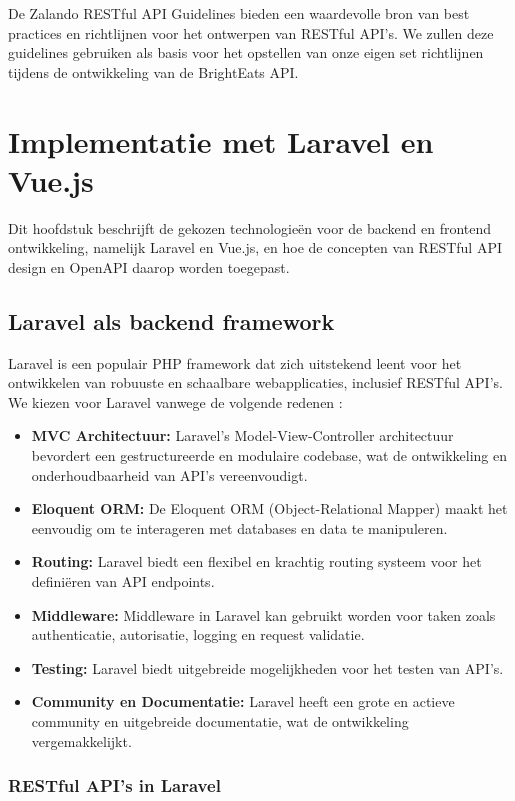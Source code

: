De Zalando RESTful API Guidelines bieden een waardevolle bron van best practices en richtlijnen voor het ontwerpen van RESTful API's. We zullen deze guidelines gebruiken als basis voor het opstellen van onze eigen set richtlijnen tijdens de ontwikkeling van de BrightEats API.

\section{Implementatie met Laravel en Vue.js}

Dit hoofdstuk beschrijft de gekozen technologieën voor de backend en frontend ontwikkeling, namelijk Laravel en Vue.js, en hoe de concepten van RESTful API design en OpenAPI daarop worden toegepast.

\subsection{Laravel als backend framework}

Laravel is een populair PHP framework dat zich uitstekend leent voor het ontwikkelen van robuuste en schaalbare webapplicaties, inclusief RESTful API's. We kiezen voor Laravel vanwege de volgende redenen \autocite{Laravel}:

\begin{itemize}
  \item \textbf{MVC Architectuur:} Laravel's Model-View-Controller architectuur bevordert een gestructureerde en modulaire codebase, wat de ontwikkeling en onderhoudbaarheid van API's vereenvoudigt.
  \item \textbf{Eloquent ORM:} De Eloquent ORM (Object-Relational Mapper) maakt het eenvoudig om te interageren met databases en data te manipuleren.
  \item \textbf{Routing:} Laravel biedt een flexibel en krachtig routing systeem voor het definiëren van API endpoints.
  \item \textbf{Middleware:} Middleware in Laravel kan gebruikt worden voor taken zoals authenticatie, autorisatie, logging en request validatie.
  \item \textbf{Testing:} Laravel biedt uitgebreide mogelijkheden voor het testen van API's.
  \item \textbf{Community en Documentatie:} Laravel heeft een grote en actieve community en uitgebreide documentatie, wat de ontwikkeling vergemakkelijkt.
\end{itemize}

\subsubsection{RESTful API's in Laravel}

